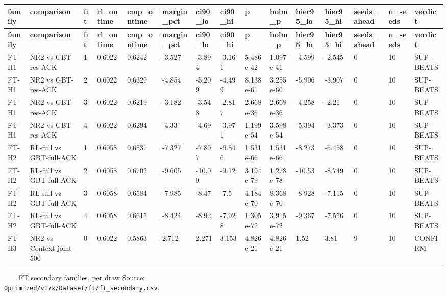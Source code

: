 \documentclass[10pt]{article}
\begin{document}
\begin{landscape}
\begin{longtable}{@{}lllllllllllllll@{}}
\toprule
\textbf{family} & \textbf{comparison} & \textbf{fit} & \textbf{rl\_ontime} & \textbf{cmp\_ontime} & \textbf{margin\_pct} & \textbf{ci90\_lo} & \textbf{ci90\_hi} & \textbf{p} & \textbf{holm\_p} & \textbf{hier95\_lo} & \textbf{hier95\_hi} & \textbf{seeds\_ahead} & \textbf{n\_seeds} & \textbf{verdict} \\
\midrule
\endfirsthead
\toprule
\textbf{family} & \textbf{comparison} & \textbf{fit} & \textbf{rl\_ontime} & \textbf{cmp\_ontime} & \textbf{margin\_pct} & \textbf{ci90\_lo} & \textbf{ci90\_hi} & \textbf{p} & \textbf{holm\_p} & \textbf{hier95\_lo} & \textbf{hier95\_hi} & \textbf{seeds\_ahead} & \textbf{n\_seeds} & \textbf{verdict} \\
\midrule
\endhead
FT-H1 & NR2 vs GBT-res-ACK & 1 & 0.6022 & 0.6242 & -3.527 & -3.894 & -3.161 & 5.486e-42 & 1.097e-41 & -4.599 & -2.545 & 0 & 10 & SUP-BEATS \\
FT-H1 & NR2 vs GBT-res-ACK & 2 & 0.6022 & 0.6329 & -4.854 & -5.209 & -4.499 & 8.138e-61 & 3.255e-60 & -5.906 & -3.907 & 0 & 10 & SUP-BEATS \\
FT-H1 & NR2 vs GBT-res-ACK & 3 & 0.6022 & 0.6219 & -3.182 & -3.548 & -2.817 & 2.668e-36 & 2.668e-36 & -4.258 & -2.21 & 0 & 10 & SUP-BEATS \\
FT-H1 & NR2 vs GBT-res-ACK & 4 & 0.6022 & 0.6294 & -4.33 & -4.69 & -3.971 & 1.199e-54 & 3.598e-54 & -5.394 & -3.373 & 0 & 10 & SUP-BEATS \\
FT-H2 & RL-full vs GBT-full-ACK & 1 & 0.6058 & 0.6537 & -7.327 & -7.807 & -6.846 & 1.531e-66 & 1.531e-66 & -8.273 & -6.458 & 0 & 10 & SUP-BEATS \\
FT-H2 & RL-full vs GBT-full-ACK & 2 & 0.6058 & 0.6702 & -9.605 & -10.09 & -9.12 & 3.194e-79 & 1.278e-78 & -10.53 & -8.749 & 0 & 10 & SUP-BEATS \\
FT-H2 & RL-full vs GBT-full-ACK & 3 & 0.6058 & 0.6584 & -7.985 & -8.47 & -7.5 & 4.184e-70 & 8.368e-70 & -8.928 & -7.115 & 0 & 10 & SUP-BEATS \\
FT-H2 & RL-full vs GBT-full-ACK & 4 & 0.6058 & 0.6615 & -8.424 & -8.92 & -7.928 & 1.305e-72 & 3.915e-72 & -9.367 & -7.556 & 0 & 10 & SUP-BEATS \\
FT-H3 & NR2 vs Context-joint-500 & 0 & 0.6022 & 0.5863 & 2.712 & 2.271 & 3.153 & 4.826e-21 & 4.826e-21 & 1.52 & 3.81 & 9 & 10 & CONFIRM \\
\bottomrule
\end{longtable}
\normalsize
\tiny
\setlength{\tabcolsep}{2pt}
\begin{longtable}{@{}lllllllllllllll@{}}
\caption{FT secondary families, per draw Source: \texttt{Optimized/v17x/Dataset/ft/ft\_secondary.csv}.}\\

\end{longtable}
\end{landscape}
\end{document}

